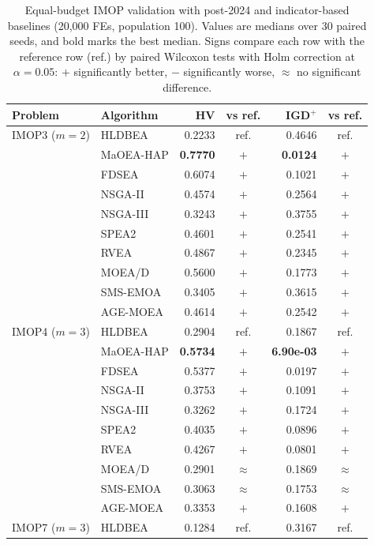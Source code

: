 \begin{table}[!htbp]
\centering
\caption{Equal-budget IMOP validation with post-2024 and indicator-based baselines (20{,}000 FEs, population 100). Values are medians over 30 paired seeds, and bold marks the best median. Signs compare each row with the reference row (ref.) by paired Wilcoxon tests with Holm correction at $\alpha=0.05$: $+$ significantly better, $-$ significantly worse, $\approx$ no significant difference.}
\label{tab:imop_recent}
\small
\setlength{\tabcolsep}{3pt}
\begin{tabular}{|l|l|r|c|r|c|}
\hline
\textbf{Problem} & \textbf{Algorithm} & \textbf{HV} & \textbf{vs ref.} & \textbf{IGD$^+$} & \textbf{vs ref.} \\ \hline
IMOP3 ($m=2$) & HLDBEA & 0.2233 & ref. & 0.4646 & ref. \\
 & MaOEA-HAP & \textbf{0.7770} & $+$ & \textbf{0.0124} & $+$ \\
 & FDSEA & 0.6074 & $+$ & 0.1021 & $+$ \\
 & NSGA-II & 0.4574 & $+$ & 0.2564 & $+$ \\
 & NSGA-III & 0.3243 & $+$ & 0.3755 & $+$ \\
 & SPEA2 & 0.4601 & $+$ & 0.2541 & $+$ \\
 & RVEA & 0.4867 & $+$ & 0.2345 & $+$ \\
 & MOEA/D & 0.5600 & $+$ & 0.1773 & $+$ \\
 & SMS-EMOA & 0.3405 & $+$ & 0.3615 & $+$ \\
 & AGE-MOEA & 0.4614 & $+$ & 0.2542 & $+$ \\
\hline
IMOP4 ($m=3$) & HLDBEA & 0.2904 & ref. & 0.1867 & ref. \\
 & MaOEA-HAP & \textbf{0.5734} & $+$ & \textbf{6.90e-03} & $+$ \\
 & FDSEA & 0.5377 & $+$ & 0.0197 & $+$ \\
 & NSGA-II & 0.3753 & $+$ & 0.1091 & $+$ \\
 & NSGA-III & 0.3262 & $+$ & 0.1724 & $+$ \\
 & SPEA2 & 0.4035 & $+$ & 0.0896 & $+$ \\
 & RVEA & 0.4267 & $+$ & 0.0801 & $+$ \\
 & MOEA/D & 0.2901 & $\approx$ & 0.1869 & $\approx$ \\
 & SMS-EMOA & 0.3063 & $\approx$ & 0.1753 & $\approx$ \\
 & AGE-MOEA & 0.3353 & $+$ & 0.1608 & $+$ \\
\hline
IMOP7 ($m=3$) & HLDBEA & 0.1284 & ref. & 0.3167 & ref. \\

\end{tabular}
\end{table}
